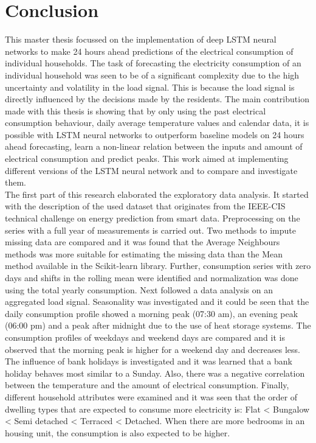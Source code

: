 \chapter{Conclusion}
\label{cha:conclusion}
This master thesis focussed on the implementation of deep LSTM neural networks to make 24 hours ahead predictions of the electrical consumption of individual households. The task of forecasting the electricity consumption of an individual household was seen to be of a significant complexity due to the high uncertainty and volatility in the load signal. This is because the load signal is directly influenced by the decisions made by the residents. The main contribution made with this thesis is showing that by only using the past electrical consumption behaviour, daily average temperature values and calendar data, it is possible with LSTM neural networks to outperform baseline models on 24 hours ahead forecasting, learn a non-linear relation between the inputs and amount of electrical consumption and predict peaks. This work aimed at implementing different versions of the LSTM neural network and to compare and investigate them.\\

The first part of this research elaborated the exploratory data analysis. It started with the description of the used dataset that originates from the IEEE-CIS technical challenge on energy prediction from smart data. Preprocessing on the series with a full year of measurements is carried out. Two methods to impute missing data are compared and it was found that the Average Neighbours methods was more suitable for estimating the missing data than the Mean method available in the Scikit-learn library. Further, consumption series with zero days and shifts in the rolling mean were identified and normalization was done using the total yearly consumption. Next followed a data analysis on an aggregated load signal. Seasonality was investigated and it could be seen that the daily consumption profile showed a morning peak (07:30 am), an evening peak (06:00 pm) and a peak after midnight due to the use of heat storage systems. The consumption profiles of weekdays and weekend days are compared and it is observed that the morning peak is higher for a weekend day and decreases less. The influence of bank holidays is investigated and it was learned that a bank holiday behaves most similar to a Sunday. Also, there was a negative correlation between the temperature and the amount of electrical consumption. Finally, different household attributes were examined and it was seen that the order of dwelling types that are expected to consume more electricity is: Flat < Bungalow < Semi detached < Terraced < Detached. When there are more bedrooms in an housing unit, the consumption is also expected to be higher. \\ 

